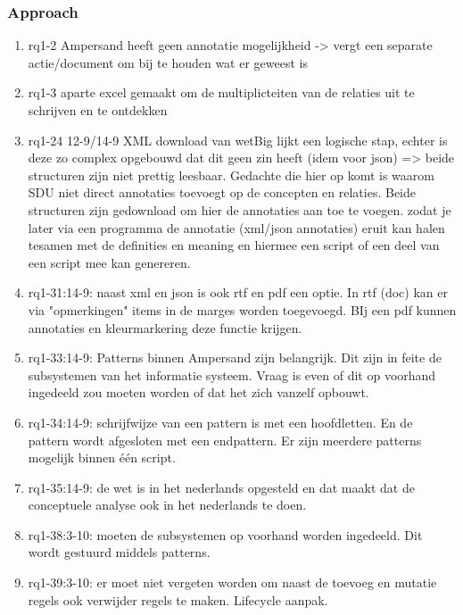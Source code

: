 \subsubsection{Approach}
\begin{comment}
plaats hier de afgehandelde items.
\end{comment}
\begin{enumerate}
    \item rq1-2 Ampersand heeft geen annotatie mogelijkheid -> vergt een separate actie/document om bij te houden wat er geweest is
    \item rq1-3 aparte excel gemaakt om de multiplicteiten van de relaties uit te schrijven en te ontdekken
    \item rq1-24 12-9/14-9 XML download van wetBig lijkt een logische stap, echter is deze zo complex opgebouwd dat dit geen zin heeft (idem voor json) => beide structuren zijn niet prettig leesbaar. Gedachte die hier op komt is waarom SDU niet direct annotaties toevoegt op de concepten en relaties. Beide structuren zijn gedownload om hier de annotaties aan toe te voegen. zodat je later via een programma de annotatie (xml/json annotaties) eruit kan halen tesamen met de definities en meaning en hiermee een script of een deel van een script mee kan genereren.
    \item rq1-31:14-9: naast xml en json is ook rtf en pdf een optie. In rtf (doc) kan er via "opmerkingen" items in de marges worden toegevoegd. BIj een pdf kunnen annotaties en kleurmarkering deze functie krijgen.
    \item rq1-33:14-9: Patterns binnen Ampersand zijn belangrijk. Dit zijn in feite de subsystemen van het informatie systeem. Vraag is even of dit op voorhand ingedeeld zou moeten worden of dat het zich vanzelf opbouwt.
    \item rq1-34:14-9: schrijfwijze van een pattern is met een hoofdletten. En de pattern wordt afgesloten met een endpattern. Er zijn meerdere patterns mogelijk binnen één script.
    \item rq1-35:14-9: de wet is in het nederlands opgesteld en dat maakt dat de conceptuele analyse ook in het nederlands te doen.
    \item rq1-38:3-10: moeten de subsystemen op voorhand worden ingedeeld. Dit wordt gestuurd middels patterns. 
    \item rq1-39:3-10: er moet niet vergeten worden om naast de toevoeg en mutatie regels ook verwijder regels te maken. Lifecycle aanpak.
\end{enumerate}

